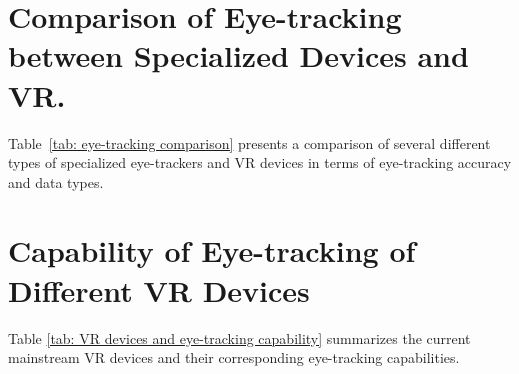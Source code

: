 \documentclass[sigconf]{acmart}
\begin{document}
\section{Comparison of Eye-tracking between Specialized Devices and VR.}
\label{sec: appendix: eye-tracking comparison}
Table~\ref{tab: eye-tracking comparison} presents a comparison of several different types of specialized eye-trackers and VR devices in terms of eye-tracking accuracy and data types.


\begin{table}[t]
\centering
\caption{Existing VR devices and their corresponding eye-tracking capabilities.}
\label{tab: VR devices and eye-tracking capability}
\end{table}

\section{Capability of Eye-tracking of Different VR Devices}
\label{sec: appendix: eye tracking of VR devices}

Table \ref{tab: VR devices and eye-tracking capability} summarizes the current mainstream VR devices and their corresponding eye-tracking capabilities.
\end{document}
